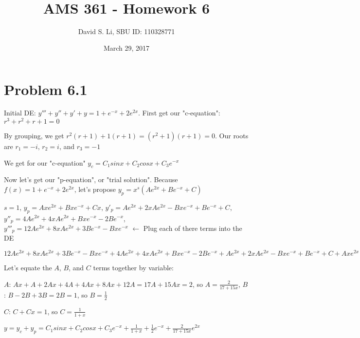 \documentclass{article}
\title{AMS 361 - Homework 6}
\author{David S. Li, SBU ID: 110328771}
\date{March 29, 2017}
\begin{document}
\maketitle

\section{Problem 6.1}

\noindent Initial DE: $y''' + y'' + y' + y = 1 + e^{-x} + 2e^{2x}$.  First get our "c-equation": $r^{3} + r^{2} + r + 1 = 0$ \par %
\noindent By grouping, we get $r^{2}(r + 1) + 1(r + 1) = (r^{2} + 1)(r + 1) = 0$.  Our roots are $r_{1} = -i$, $r_{2} = i$, and $r_{3} = -1$ \par %
\noindent We get for our "c-equation" $y_{c} = C_{1}sinx + C_{2}cosx + C_{3}e^{-x}$ \par\vspace{0.25cm}

\noindent Now let's get our "p-equation", or "trial solution".  Because $f(x) = 1 + e^{-x} + 2e^{2x}$, let's propose $y_{p} = x^{s}(Ae^{2x} + Be^{-x} + C)$ \par
\noindent $s = 1$, $y_{p} = Axe^{2x} + Bxe^{-x} + Cx$,
\noindent $y'_{p} = Ae^{2x} + 2xAe^{2x} - Bxe^{-x} + Be^{-x} + C$, $y''_{p} = 4Ae^{2x} + 4xAe^{2x} + Bxe^{-x} - 2Be^{-x}$, $y'''_{p} = 12Ae^{2x} + 8xAe^{2x} + 3Be^{-x} - Bxe^{-x}$ $\leftarrow$ Plug each of there terms into the DE \par
\noindent $12Ae^{2x} + 8xAe^{2x} + 3Be^{-x} - Bxe^{-x} + 4Ae^{2x} + 4xAe^{2x} + Bxe^{-x} - 2Be^{-x} + Ae^{2x} + 2xAe^{2x} - Bxe^{-x} + Be^{-x} + C + Axe^{2x} + Bxe^{-x} + Cx = 1 + e^{-x} + 2e^{2x}$ \par\vspace{0.25cm}

\noindent Let's equate the $A$, $B$, and $C$ terms together by variable: \par
\noindent $A$: $Ax + A + 2Ax + 4A + 4Ax + 8Ax + 12A = 17A + 15Ax = 2$, so $A = \frac{2}{17 + 15x}$, $B$: $B - 2B + 3B = 2B = 1$, so $B = \frac{1}{2} $ \par
\noindent $C$: $C + Cx = 1$, so $C = \frac{1}{1 + x}$ \par\vspace{0.25cm}

\noindent $y = y_{c} + y_{p} = C_{1}sinx + C_{2}cosx + C_{3}e^{-x} + \frac{1}{1 + x} + \frac{1}{2}e^{-x} + \frac{2}{17 + 15x}e^{2x}$ \par
\end{document}

